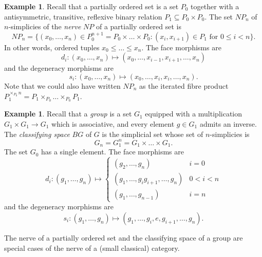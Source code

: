 \documentclass[a4paper]{amsart}
\numberwithin{figure}{section}
\theoremstyle{theorem}
\theoremstyle{definition}
\newtheorem{exam}[thm]{Example}
\begin{document}
\begin{exam} \label{exam:poset}
Recall that a partially ordered set is a set $P_0$ together with a antisymmetric, transitive, reflexive binary relation $P_1 \subseteq P_0 \times P_0$. The set $NP_n$ of $n$-simplicies of the \emph{nerve} $NP$ of a partially ordered set is 
\[ NP_n = \{ (x_0, \dots, x_n) \in P_0^{n+1} = P_0 \times \dots \times P_0 : (x_i, x_{i+1}) \in P_1\textrm{ for } 0 \leq i < n \}. \]
In other words, ordered tuples $x_0 \leq \dots \leq x_n$. The face morphisms are
\[ d_i: (x_0, \dots, x_n) \mapsto (x_0, \dots, x_{i-1}, x_{i+1}, \dots, x_n) \]
and the degeneracy morphisms are 
\[ s_i: (x_0, \dots, x_n) \mapsto (x_0, \dots, x_{i}, x_i, \dots, x_n). \]
Note that we could also have written $NP_n$ as the iterated fibre product $P_1^{\times_{P_0} n} = P_1 \times_{P_0} \dots \times_{P_0} P_1$. 
\end{exam}

\begin{exam} \label{exam:bg}
Recall that a \emph{group} is a set $G_1$ equipped with a multiplication $G_1 \times G_1 \to G_1$ which is associative, and every element $g \in G_1$ admits an inverse. The \emph{classifying space} $BG$ of $G$ is the simplicial set whose set of $n$-simplicies is 
\[ G_n = G_1^n = G_1 \times \dots \times G_1. \]
The set $G_0$ has a single element. The face morphisms are 
\[ d_i: (g_1, \dots, g_n) \mapsto \left \{ \begin{array}{cc}
(g_2, \dots, g_n) & i = 0 \\
(g_1, \dots, g_ig_{i+1}, \dots, g_n) & 0 < i < n \\
(g_1, \dots, g_{n-1}) & i = n
\end{array} \right . \]
and the degeneracy morphisms are
\[ s_i: (g_1, \dots, g_n) \mapsto (g_1, \dots, g_i, e, g_{i+1}, \dots, g_n). \]
\end{exam}

The nerve of a partially ordered set and the classifying space of a group are special cases of the nerve of a (small classical) category.
\end{document}
